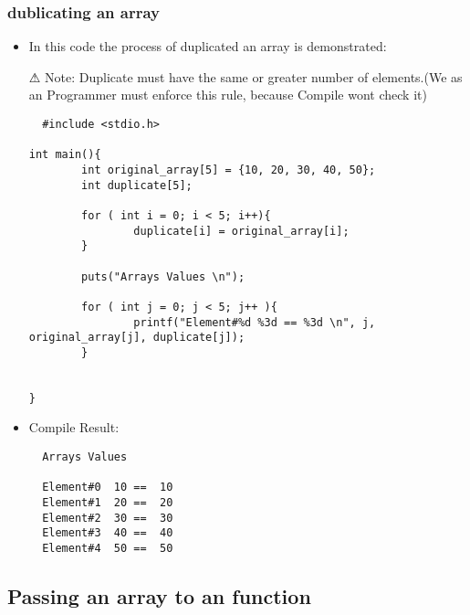 \subsubsection{dublicating an array}
\begin{itemize}
  \item In this code the process of duplicated an array is demonstrated:
  \item[⚠] Note: Duplicate must have the same or greater number of elements.(We as an Programmer must enforce this rule, because Compile wont check it)
\begin{lstlisting}
  #include <stdio.h>

int main(){
        int original_array[5] = {10, 20, 30, 40, 50};
        int duplicate[5];

        for ( int i = 0; i < 5; i++){
                duplicate[i] = original_array[i];
        }

        puts("Arrays Values \n");

        for ( int j = 0; j < 5; j++ ){
                printf("Element#%d %3d == %3d \n", j, original_array[j], duplicate[j]);
        }


}
\end{lstlisting}
\item Compile Result:
\begin{lstlisting}
  Arrays Values

  Element#0  10 ==  10
  Element#1  20 ==  20
  Element#2  30 ==  30
  Element#3  40 ==  40
  Element#4  50 ==  50
\end{lstlisting}

\end{itemize}


\subsection{Passing an array to an function}

